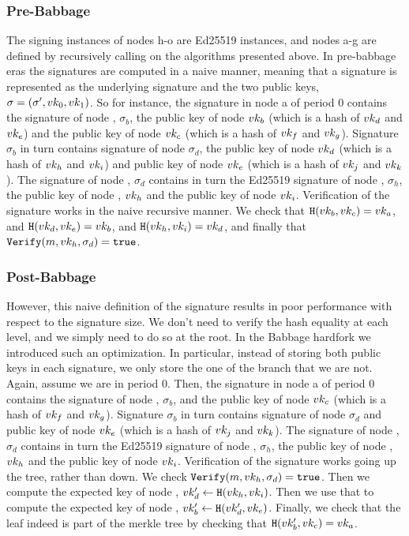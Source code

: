 \subsubsection{Pre-Babbage}
The signing instances of nodes h-o are Ed25519 instances, and nodes a-g are defined by recursively calling on the
algorithms presented above.
In pre-babbage eras the signatures are computed in a naive manner, meaning
that a signature is represented as the underlying signature and the two public keys, $\sigma = (\sigma', vk_0,
vk_1)$. So for instance, the signature in node a of period 0 contains the signature of node ,
$\sigma_b$, the public key of node  $vk_b$ (which is a hash of $vk_d$ and $vk_e$) and the public key
of node  $vk_c$ (which is a hash of $vk_f$ and $vk_g$). Signature $\sigma_b$ in turn contains
signature of node  $\sigma_d$, the public key of node  $vk_d$ (which is a hash of $vk_h$
and $vk_i$) and public key of node  $vk_e$ (which is a hash of $vk_j$ and $vk_k$). The signature of
node , $\sigma_d$ contains in turn the Ed25519 signature of node , $\sigma_h$, the public key
of node , $vk_h$ and the public key of node  $vk_i$. Verification of the signature works in
the naive recursive manner. We check that $\texttt{H}(vk_b, vk_c) = vk_a$, and $\texttt{H}(vk_d, vk_e) = vk_b$, and
$\texttt{H}(vk_h, vk_i) = vk_d$, and finally that $\texttt{Verify}(m, vk_h, \sigma_d) = \texttt{true}$.

\subsubsection{Post-Babbage}
However, this naive definition of the signature results in poor performance with respect to the signature size. We
don't need to verify the hash equality at each level, and we simply need to do so at the root. In the Babbage
hardfork we introduced such an optimization. In particular, instead of storing both public keys in each signature, we
only store the one of the branch that we are not. Again, assume we are in period 0. Then, the signature in node a of
period 0 contains the signature of node , $\sigma_b$, and the public key of node  $vk_c$
(which is a hash of $vk_f$ and $vk_g$). Signature $\sigma_b$ in turn contains signature of node 
$\sigma_d$ and public key of node  $vk_e$ (which is a hash of $vk_j$ and $vk_k$). The signature of
node , $\sigma_d$ contains in turn the Ed25519 signature of node , $\sigma_h$, the public key
of node , $vk_h$ and the public key of node  $vk_i$. Verification of the signature works
going up the tree, rather than down. We check $\texttt{Verify}(m, vk_h, \sigma_d) = \texttt{true}$. Then we compute the expected
key of node , $vk_d'\gets\texttt{H}(vk_h, vk_i)$. Then we use that to compute the expected key of node
, $vk_b'\gets\texttt{H}(vk_d', vk_e)$. Finally, we check that the leaf indeed is part of the merkle tree by
checking that $\texttt{H}(vk_b', vk_c) = vk_a$.

